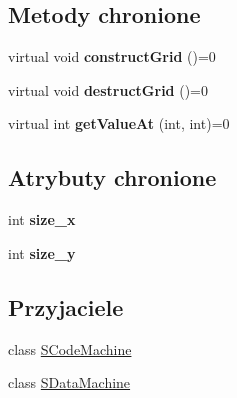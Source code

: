 \subsection*{Metody chronione}
\begin{CompactItemize}
\item 
\hypertarget{classSAbstractGrid_919248aad138ffb1c969e73c3e637dcd}{
virtual void \textbf{constructGrid} ()=0}
\label{classSAbstractGrid_919248aad138ffb1c969e73c3e637dcd}

\item 
\hypertarget{classSAbstractGrid_fb63d8cf5210c3606a3b7add19f06833}{
virtual void \textbf{destructGrid} ()=0}
\label{classSAbstractGrid_fb63d8cf5210c3606a3b7add19f06833}

\item 
\hypertarget{classSAbstractGrid_d8772e08d58f970d885775cb9682bf6d}{
virtual int \textbf{getValueAt} (int, int)=0}
\label{classSAbstractGrid_d8772e08d58f970d885775cb9682bf6d}

\end{CompactItemize}
\subsection*{Atrybuty chronione}
\begin{CompactItemize}
\item 
\hypertarget{classSAbstractGrid_f0b1916fda47bbd921fc1b5b5abadb72}{
int \textbf{size\_\-x}}
\label{classSAbstractGrid_f0b1916fda47bbd921fc1b5b5abadb72}

\item 
\hypertarget{classSAbstractGrid_b9fddbe2004e7242dff69aa20da8a3c3}{
int \textbf{size\_\-y}}
\label{classSAbstractGrid_b9fddbe2004e7242dff69aa20da8a3c3}

\end{CompactItemize}
\subsection*{Przyjaciele}
\begin{CompactItemize}
\item 
\hypertarget{classSAbstractGrid_13f503f5e1b3625e973ac350880b3a31}{
class \hyperlink{classSAbstractGrid_13f503f5e1b3625e973ac350880b3a31}{SCodeMachine}}
\label{classSAbstractGrid_13f503f5e1b3625e973ac350880b3a31}

\item 
\hypertarget{classSAbstractGrid_b064517f75c184bae39efba1df818a12}{
class \hyperlink{classSAbstractGrid_b064517f75c184bae39efba1df818a12}{SDataMachine}}
\label{classSAbstractGrid_b064517f75c184bae39efba1df818a12}

\end{CompactItemize}


